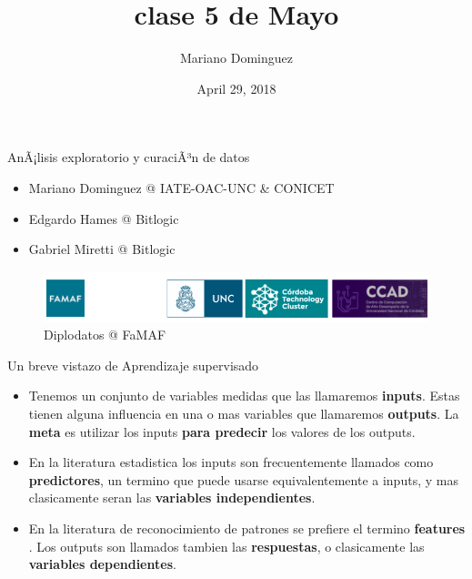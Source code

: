 \documentclass[ignorenonframetext,]{beamer}
\title{clase 5 de Mayo}
\author{Mariano Dominguez}
\date{April 29, 2018}
\providecommand{\tightlist}{%
  \setlength{\itemsep}{0pt}\setlength{\parskip}{0pt}}
\begin{document}
\frame{\titlepage}

\begin{frame}{AnÃ¡lisis exploratorio y curaciÃ³n de datos}

\begin{itemize}
\tightlist
\item
  Mariano Dominguez @ IATE-OAC-UNC \& CONICET
\item
  Edgardo Hames @ Bitlogic
\item
  Gabriel Miretti @ Bitlogic
\end{itemize}

\begin{figure}
\centering
\includegraphics{./logos-diplomatura-3.png}
\caption{Diplodatos @ FaMAF}
\end{figure}

\end{frame}

\begin{frame}

\begin{block}{Un breve vistazo de Aprendizaje supervisado}

\begin{itemize}
\item
  Tenemos un conjunto de variables medidas que las llamaremos
  \textbf{inputs}. Estas tienen alguna influencia en una o mas variables
  que llamaremos \textbf{outputs}. La \textbf{meta} es utilizar los
  inputs \textbf{para predecir} los valores de los outputs.
\item
  En la literatura estadistica los inputs son frecuentemente llamados
  como \textbf{predictores}, un termino que puede usarse
  equivalentemente a inputs, y mas clasicamente seran las
  \textbf{variables independientes}.
\item
  En la literatura de reconocimiento de patrones se prefiere el termino
  \textbf{features} . Los outputs son llamados tambien las
  \textbf{respuestas}, o clasicamente las \textbf{variables
  dependientes}.
\end{itemize}

\end{block}

\end{frame}
\end{document}
